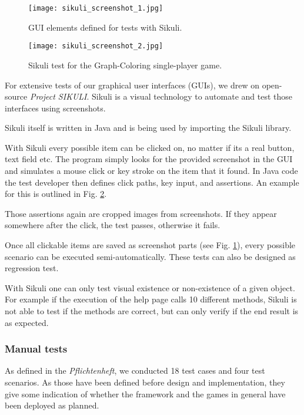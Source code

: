 \begin{figure}[!h]
	\centering
	\texttt{[image: sikuli\_screenshot\_1.jpg]}
	\caption{GUI elements defined for tests with Sikuli.}
	\label{img:screenSikuli1}
\end{figure}
\begin{figure}[!h]
	\centering
	\texttt{[image: sikuli\_screenshot\_2.jpg]}
	\caption{Sikuli test for the Graph-Coloring single-player game.}
	\label{img:screenSikuli2}
\end{figure}
For extensive tests of our graphical user interfaces (GUIs), we drew on open-source \emph{Project SIKULI}. Sikuli is a visual technology to automate and test those interfaces using screenshots.\par
Sikuli itself is written in Java and is being used by importing the Sikuli library.\par
With Sikuli every possible item can be clicked on, no matter if its a real button, text field etc. The program simply looks for the provided screenshot in the GUI and simulates a mouse click or key stroke on the item that it found. In Java code the test developer then defines click paths, key input, and assertions. An example for this is outlined in Fig. \ref{img:screenSikuli2}.\par
Those assertions again are cropped images from screenshots. If they appear somewhere after the click, the test passes, otherwise it fails.\par
Once all clickable items are saved as screenshot parts (see Fig. \ref{img:screenSikuli1}), every possible scenario can be executed semi-automatically. These tests can also be designed as regression test.\par
With Sikuli one can only test visual existence or non-existence of a given object. For example if the execution of the help page calls 10 different methods, Sikuli is not able to test if the methods are correct, but can only verify if the end result is as expected.\par

\subsubsection{Manual tests}

As defined in the \emph{Pflichtenheft}, we conducted 18 test cases and four test scenarios. As those have been defined before design and implementation, they give some indication of whether the framework and the games in general have been deployed as planned.\par

